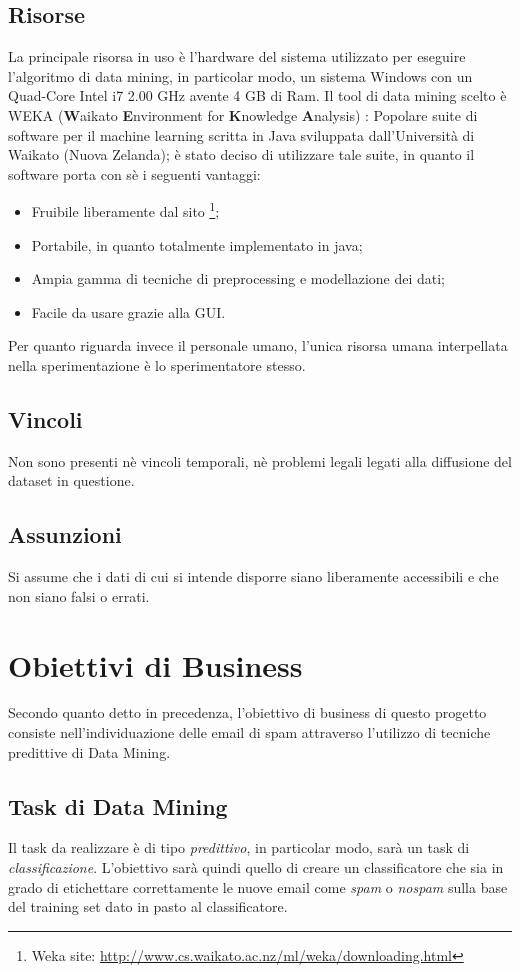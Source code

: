 \subsection{Risorse}
La principale risorsa in uso è l'hardware del sistema utilizzato per eseguire l'algoritmo di data mining, in particolar modo, un sistema Windows con un Quad-Core Intel i7 2.00 GHz avente 4 GB di Ram.
Il tool di data mining scelto è WEKA (\textbf{W}aikato \textbf{E}nvironment for \textbf{K}nowledge \textbf{A}nalysis) \cite{WEKA}:
Popolare suite di software per il machine learning scritta in Java sviluppata dall'Università di Waikato (Nuova Zelanda); è stato deciso di utilizzare tale suite, in quanto il software porta con sè i seguenti vantaggi:
\begin{itemize}
	\item Fruibile liberamente dal sito \footnote{Weka site: \url{http://www.cs.waikato.ac.nz/ml/weka/downloading.html}};
    \item Portabile, in quanto totalmente implementato in java;
    \item Ampia gamma di tecniche di preprocessing e modellazione dei dati;
    \item Facile da usare grazie alla GUI.
\end{itemize}
Per quanto riguarda invece il personale umano, l'unica risorsa umana interpellata nella sperimentazione è lo sperimentatore stesso.
\subsection{Vincoli}
	Non sono presenti nè vincoli temporali, nè problemi legali legati alla diffusione del dataset in questione.
\subsection{Assunzioni}
	Si assume che i dati di cui si intende disporre siano liberamente accessibili e che non siano falsi o errati.
\section{Obiettivi di Business}
	Secondo quanto detto in precedenza, l'obiettivo di business di questo progetto consiste nell'individuazione delle email di spam attraverso l'utilizzo di tecniche predittive di Data Mining.
\subsection{Task di Data Mining}
	\label{task}
	Il task da realizzare è di tipo \textit{predittivo}, in particolar modo, sarà un task di \textit{classificazione}. L'obiettivo sarà quindi quello di creare un classificatore che sia in grado di etichettare correttamente le nuove email come \textit{spam} o \textit{nospam} sulla base del training set dato in pasto al classificatore. 

